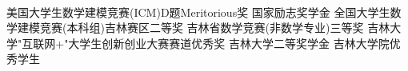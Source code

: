 \\
	\par{\quad{}}
	\par{\quad{}}
\begin{scholarship}
					{美国大学生数学建模竞赛(ICM)D题Meritorious奖}	
					{国家励志奖学金}
					{全国大学生数学建模竞赛(本科组)吉林赛区二等奖}
	\scholarshipentry{}
					{吉林省数学竞赛(非数学专业)三等奖}
					{吉林大学"互联网+"大学生创新创业大赛赛道优秀奖}	
					{吉林大学二等奖学金}
	\scholarshipentry{}
					{吉林大学院优秀学生}
					
\end{scholarship}